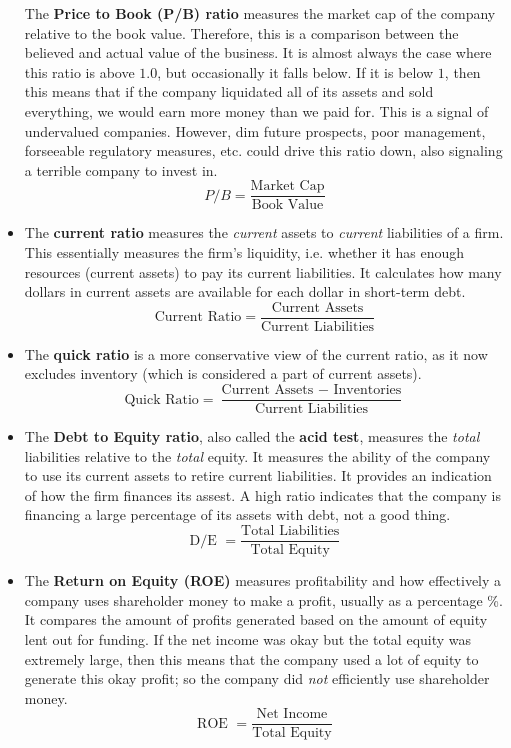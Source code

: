 \documentclass{article}
\begin{document}
\begin{itemize}
The \textbf{Price to Book (P/B) ratio} measures the market cap of the company relative to the book value. Therefore, this is a comparison between the believed and actual value of the business. It is almost always the case where this ratio is above $1.0$, but occasionally it falls below. If it is below $1$, then this means that if the company liquidated all of its assets and sold everything, we would earn more money than we paid for. This is a signal of undervalued companies. However, dim future prospects, poor management, forseeable regulatory measures, etc. could drive this ratio down, also signaling a terrible company to invest in.
\begin{equation}
  P/B = \frac{\text{Market Cap}}{\text{Book Value}}
\end{equation}
\item
The \textbf{current ratio} measures the \textit{current} assets to \textit{current} liabilities of a firm. This essentially measures the firm's liquidity, i.e. whether it has enough resources (current assets) to pay its current liabilities. It calculates how many dollars in current assets are available for each dollar in short-term debt.
\begin{equation}
  \text{Current Ratio} = \frac{\text{Current Assets}}{\text{Current Liabilities}}
\end{equation}
\item
The \textbf{quick ratio} is a more conservative view of the current ratio, as it now excludes inventory (which is considered a part of current assets).
\begin{equation}
  \text{Quick Ratio} = \frac{\text{Current Assets } - \text{ Inventories}}{\text{Current Liabilities}}
\end{equation}
\item
The \textbf{Debt to Equity ratio}, also called the \textbf{acid test}, measures the \textit{total} liabilities relative to the \textit{total} equity. It measures the ability of the company to use its current assets to retire current liabilities. It provides an indication of how the firm finances its assest. A high ratio indicates that the company is financing a large percentage of its assets with debt, not a good thing.
\begin{equation}
  \text{D/E } = \frac{\text{Total Liabilities}}{\text{Total Equity}}
\end{equation}
\item
The \textbf{Return on Equity (ROE)} measures profitability and how effectively a company uses shareholder money to make a profit, usually as a percentage \%. It compares the amount of profits generated based on the amount of equity lent out for funding. If the net income was okay but the total equity was extremely large, then this means that the company used a lot of equity to generate this okay profit; so the company did \textit{not} efficiently use shareholder money.
\begin{equation}
  \text{ROE } = \frac{\text{Net Income}}{\text{Total Equity}}
\end{equation}
\end{itemize}
\end{document}
